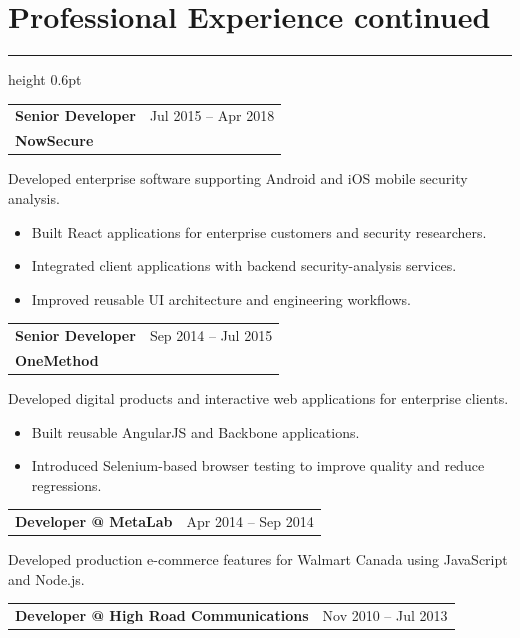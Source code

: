 \documentclass[10pt,letterpaper]{article}
\makeatletter
\newcommand{\headingfont}{\plexmono}
\newcommand{\sectionrule}{\vspace{1pt}\color{rule}\hrule height 0.6pt\color{ink}\vspace{5pt}}
\newcommand{\role}[3]{%
  \begin{tabularx}{\textwidth}{@{}X r@{}}
    {\headingfont\bfseries\large #1} & {\headingfont\small\color{muted} #3}\\[-1pt]
    {\headingfont\bfseries\color{tealink} #2} &
  \end{tabularx}\vspace{0.5pt}
}
\newcommand{\smallrole}[3]{%
  \begin{tabularx}{\textwidth}{@{}X r@{}}
    {\headingfont\bfseries #1 \textcolor{muted}{@} \textcolor{tealink}{#2}} & {\headingfont\small\color{muted} #3}
  \end{tabularx}\vspace{0.5pt}
}
\makeatother
\begin{document}
\newpage

\section[Professional Experience continued]{Professional Experience \textnormal{\color{muted}\small continued}}

\sectionrule

\role{Senior Developer}{NowSecure}{Jul 2015 -- Apr 2018}

Developed enterprise software supporting Android and iOS mobile security analysis.

\begin{itemize}

  \item Built React applications for enterprise customers and security researchers.

  \item Integrated client applications with backend security-analysis services.

  \item Improved reusable UI architecture and engineering workflows.

\end{itemize}

\vspace{4pt}

\role{Senior Developer}{OneMethod}{Sep 2014 -- Jul 2015}

Developed digital products and interactive web applications for enterprise clients.

\begin{itemize}

  \item Built reusable AngularJS and Backbone applications.

  \item Introduced Selenium-based browser testing to improve quality and reduce regressions.

\end{itemize}

\vspace{4pt}

\smallrole{Developer}{MetaLab}{Apr 2014 -- Sep 2014}

Developed production e-commerce features for Walmart Canada using JavaScript and Node.js.

\vspace{4pt}

\smallrole{Developer}{High Road Communications}{Nov 2010 -- Jul 2013}
\end{document}
